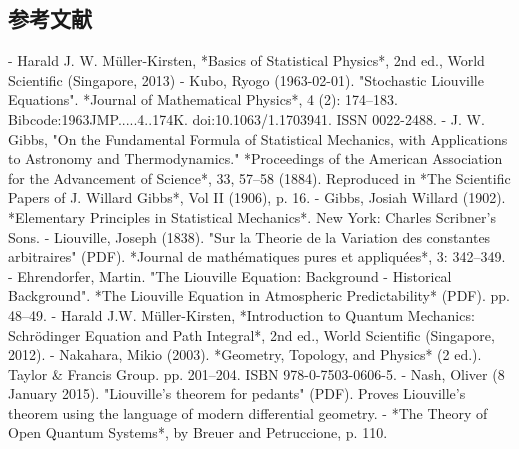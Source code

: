 \subsection{参考文献}  
- Harald J. W. Müller-Kirsten, *Basics of Statistical Physics*, 2nd ed., World Scientific (Singapore, 2013)  
- Kubo, Ryogo (1963-02-01). "Stochastic Liouville Equations". *Journal of Mathematical Physics*, 4 (2): 174–183. Bibcode:1963JMP.....4..174K. doi:10.1063/1.1703941. ISSN 0022-2488.  
- J. W. Gibbs, "On the Fundamental Formula of Statistical Mechanics, with Applications to Astronomy and Thermodynamics." *Proceedings of the American Association for the Advancement of Science*, 33, 57–58 (1884). Reproduced in *The Scientific Papers of J. Willard Gibbs*, Vol II (1906), p. 16.  
- Gibbs, Josiah Willard (1902). *Elementary Principles in Statistical Mechanics*. New York: Charles Scribner's Sons.  
- Liouville, Joseph (1838). "Sur la Theorie de la Variation des constantes arbitraires" (PDF). *Journal de mathématiques pures et appliquées*, 3: 342–349.  
- Ehrendorfer, Martin. "The Liouville Equation: Background - Historical Background". *The Liouville Equation in Atmospheric Predictability* (PDF). pp. 48–49.  
- Harald J.W. Müller-Kirsten, *Introduction to Quantum Mechanics: Schrödinger Equation and Path Integral*, 2nd ed., World Scientific (Singapore, 2012).  
- Nakahara, Mikio (2003). *Geometry, Topology, and Physics* (2 ed.). Taylor & Francis Group. pp. 201–204. ISBN 978-0-7503-0606-5.  
- Nash, Oliver (8 January 2015). "Liouville's theorem for pedants" (PDF). Proves Liouville's theorem using the language of modern differential geometry.  
- *The Theory of Open Quantum Systems*, by Breuer and Petruccione, p. 110.